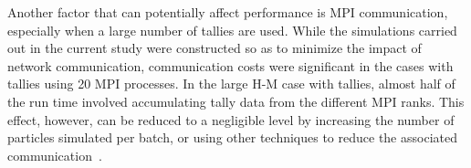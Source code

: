 \documentclass{mc2015}
\begin{document}
Another factor that can potentially affect performance is MPI communication,
especially when a large number of tallies are used. While the simulations
carried out in the current study were constructed so as to minimize the impact
of network communication, communication costs were significant in the cases with
tallies using 20 MPI processes. In the large H-M case with tallies, almost half
of the run time involved accumulating tally data from the different MPI ranks.
This effect, however, can be reduced to a negligible level by increasing the
number of particles simulated per batch, or using other techniques to reduce the
associated communication~\cite{trans-romano-2012}.

\end{document}
